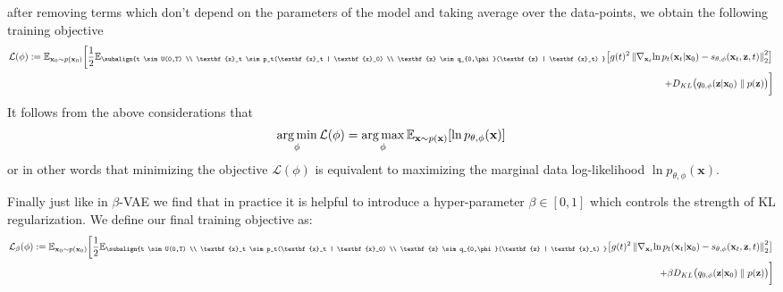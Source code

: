 after removing terms which don't depend on the parameters of the model and taking average over the data-points, we obtain the following training objective
\begin{equation*}
\begin{aligned}
    \mathcal{L}(\phi)  := \mathbb{E}_{\textbf{x}_0 \sim p(\textbf{x}_0)} \bigg[ 
    \frac{1}{2} \mathbb{E}_{\subalign{t \sim U(0,T) \\ \textbf{x}_t \sim p_t(\textbf{x}_t | \textbf{x}_0) \\ \textbf{z} \sim q_{0,\phi}(\textbf{z} | \textbf{x}_t) }} 
    \big[
    g(t)^2  \norm{ \nabla_{\textbf{x}_t}{\ln{p_t(\textbf{x}_t | \textbf{x}_0)}} - s_{\theta, \phi}(\textbf{x}_t, \textbf{z}, t)}_2^2  
    & \big] \\
    + D_{KL}\big( q_{0,\phi}(\textbf{z} | \textbf{x}_0)  \parallel p(\textbf{z})\big)  & \bigg]
\end{aligned}    
\end{equation*}
It follows from the above considerations that
\begin{gather*}
    \operatorname*{arg\,min}_\phi \mathcal{L} (\phi) = \operatorname*{arg\,max}_\phi \mathbb{E}_{\textbf{x} \sim p(\textbf{x})} [\ln p_{\theta, \phi}(\textbf{x}) ]
\end{gather*}
or in other words that minimizing the objective $\mathcal{L}(\phi) $ is equivalent to maximizing the marginal data log-likelihood $\ln p_{\theta, \phi}(\textbf{x}) $.

Finally just like in $\beta$-VAE we find that in practice it is helpful to introduce a hyper-parameter $\beta \in [0,1]$ which controls the strength of KL regularization. We define our final training objective as:
\begin{equation*}
\begin{aligned}
    \mathcal{L}_\beta(\phi)  := \mathbb{E}_{\textbf{x}_0 \sim p(\textbf{x}_0)} \bigg[ 
    \frac{1}{2} \mathbb{E}_{\subalign{t \sim U(0,T) \\ \textbf{x}_t \sim p_t(\textbf{x}_t | \textbf{x}_0) \\ \textbf{z} \sim q_{0,\phi}(\textbf{z} | \textbf{x}_t) }} 
    \big[
    g(t)^2  \norm{ \nabla_{\textbf{x}_t}{\ln{p_t(\textbf{x}_t | \textbf{x}_0)}} - s_{\theta, \phi}(\textbf{x}_t, \textbf{z}, t)}_2^2  
    & \big] \\
    + \beta D_{KL}\big( q_{0,\phi}(\textbf{z} | \textbf{x}_0)  \parallel p(\textbf{z})\big)  & \bigg]
\end{aligned}    
\end{equation*}

